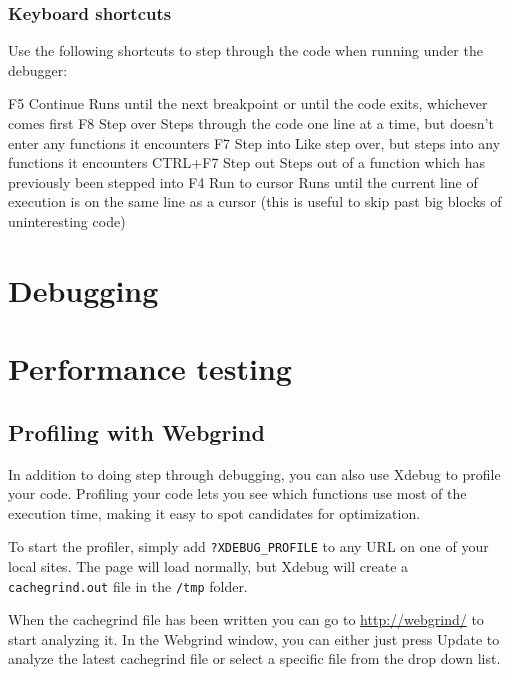 \documentclass[draft,ebook,10pt,twoside,openright]{memoir}
\begin{document}
\subsection{Keyboard shortcuts}

Use the following shortcuts to step through the code when running under the debugger:

F5 	Continue 	Runs until the next breakpoint or until the code exits, whichever comes first
F8 	Step over 	Steps through the code one line at a time, but doesn’t enter any functions it encounters
F7 	Step into 	Like step over, but steps into any functions it encounters
CTRL+F7 	Step out 	Steps out of a function which has previously been stepped into
F4 	Run to cursor 	Runs until the current line of execution is on the same line as a cursor (this is useful to skip past big blocks of uninteresting code)

\chapter{Debugging} \label{chdebugging}

\chapter{Performance testing} \label{chperformance}

\section{Profiling with Webgrind}

In addition to doing step through debugging, you can also use Xdebug to profile your code. Profiling your code lets you see which functions use most of the execution time, making it easy to spot candidates for optimization.

To start the profiler, simply add \verb!?XDEBUG_PROFILE! to any URL on one of your local sites. The page will load normally, but Xdebug will create a \verb!cachegrind.out! file in the \verb!/tmp! folder.

When the cachegrind file has been written you can go to \url{http://webgrind/} to start analyzing it. In the Webgrind window, you can either just press Update to analyze the latest cachegrind file or select a specific file from the drop down list.
\end{document}
